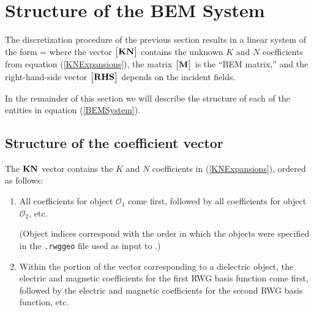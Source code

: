 \documentclass[letterpaper]{article}
\begin{document}
\section{Structure of the BEM System}

The discretization procedure of the previous section results in a 
linear system of the form
{ \Big[ \vb M \Big]  \cdot \Big[ \vb{KN} \Big] =  }
where the vector $\big[\mathbf{KN}\big]$ contains the unknown 
$K$ and $N$ coefficients from equation (\ref{KNExpansions}),
the matrix $\big[\mathbf{M}\big]$ is the ``BEM matrix,''
and the right-hand-side vector $\big[\mathbf{RHS}\big]$ 
depends on the incident fields.

In the remainder of this section we will describe the structure
of each of the entities in equation (\ref{BEMSystem}). 

\subsection{Structure of the coefficient vector}

The $\mathbf{KN}$ vector contains the $K$ and $N$ coefficients
in (\ref{KNExpansions}), ordered as follows:

\begin{enumerate}
 \item All coefficients for object $\mathcal{O}_1$ come first, 
       followed by all coefficients for object $\mathcal{O}_2$, etc.

       (Object indices correspond with the order in which the 
        objects were specified in the \texttt{.rwggeo} file 
        used as input to \ls.)
       
 \item Within the portion of the vector corresponding to a 
       dielectric object, the electric and magnetic coefficients
       for the first RWG basis function come first, followed
       by the electric and magnetic coefficients
       for the second RWG basis function, etc.

\end{enumerate}
\end{document}
